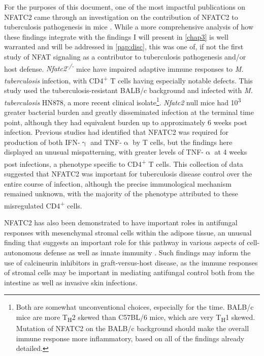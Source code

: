For the purposes of this document, one of the most impactful publications on NFATC2 came through an investigation on the contribution of NFATC2 to tuberculosis pathogenesis in mice \citep{Via2012}. While a more comprehensive analysis of how these findings integrate with the findings I will present in \autoref{chap3} is well warranted and will be addressed in \autoref{pap:disc}, this was one of, if not the first study of NFAT signaling as a contributor to tuberculosis pathogenesis and/or host defense. \textit{Nfatc2\textsuperscript{\hyp{}/\hyp{}}} mice have impaired adaptive immune responses to \textit{M. tuberculosis} infection, with CD4\textsuperscript{+} T cells having especially notable defects. This study used the tuberculosis\hyp{}resistant BALB/c background and infected with \textit{M. tuberculosis} HN878, a more recent clinical isolate\footnote{Both are somewhat unconventional choices, especially for the time. BALB/c mice are more T\textsubscript{H}2 skewed than C57BL/6 mice, which are very T\textsubscript{H}1 skewed. Mutation of NFATC2 on the BALB/c background should make the overall immune response more inflammatory, based on all of the findings already detailed.}. \textit{Nfatc2} null mice had 10\textsuperscript{3} greater bacterial burden and greatly disseminated infection at the terminal time point, although they had equivalent burden up to approximately 6 weeks post infection. Previous studies had identified that NFATC2 was required for production of both IFN\hyp{}$\upgamma$ and TNF\hyp{}$\upalpha$ by T cells, but the findings here displayed an unusual mispatterning, with greater levels of TNF\hyp{}$\upalpha$ at 4 weeks post infections, a phenotype specific to CD4\textsuperscript{+} T cells. This collection of data suggested that NFATC2 was important for tuberculosis disease control over the entire course of infection, although the precise immunological mechanism remained unknown, with the majority of the phenotype attributed to these misregulated CD4\textsuperscript{+} cells. 

NFATC2 has also been demonstrated to have important roles in antifungal responses with mesenchymal stromal cells within the adipose tissue, an unusual finding that suggests an important role for this pathway in various aspects of cell-autonomous defense as well as innate immunity \citep{Tidu2021}. Such findings may inform the use of calcineurin inhibitors in graft-versus-host disease, as the immune responses of stromal cells may be important in mediating antifungal control both from the intestine as well as invasive skin infections. 

